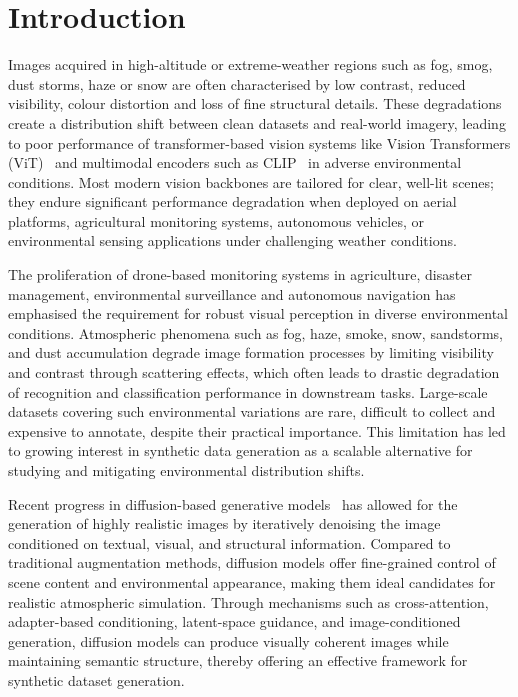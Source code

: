
\chapter{Introduction}
\label{chap:introduction}
\thispagestyle{empty}  %

Images acquired in high-altitude or extreme-weather regions such as fog, smog, dust storms, haze or snow are often characterised by low contrast, reduced visibility, colour distortion and loss of fine structural details. These degradations create a distribution shift between clean datasets and real-world imagery, leading to poor performance of transformer-based vision systems like Vision Transformers (ViT)~\cite{dosovitskiy2020vit} and multimodal encoders such as CLIP~\cite{radford2021clip} in adverse environmental conditions. Most modern vision backbones are tailored for clear, well-lit scenes; they endure significant performance degradation when deployed on aerial platforms, agricultural monitoring systems, autonomous vehicles, or environmental sensing applications under challenging weather conditions.

\noindent The proliferation of drone-based monitoring systems in agriculture, disaster management, environmental surveillance and autonomous navigation has emphasised the requirement for robust visual perception in diverse environmental conditions. Atmospheric phenomena such as fog, haze, smoke, snow, sandstorms, and dust accumulation degrade image formation processes by limiting visibility and contrast through scattering effects, which often leads to drastic degradation of recognition and classification performance in downstream tasks. Large-scale datasets covering such environmental variations are rare, difficult to collect and expensive to annotate, despite their practical importance. This limitation has led to growing interest in synthetic data generation as a scalable alternative for studying and mitigating environmental distribution shifts.

\noindent Recent progress in diffusion-based generative models~\cite{ho2020ddpm} has allowed for the generation of highly realistic images by iteratively denoising the image conditioned on textual, visual, and structural information. Compared to traditional augmentation methods, diffusion models offer fine-grained control of scene content and environmental appearance, making them ideal candidates for realistic atmospheric simulation. Through mechanisms such as cross-attention, adapter-based conditioning, latent-space guidance, and image-conditioned generation, diffusion models can produce visually coherent images while maintaining semantic structure, thereby offering an effective framework for synthetic dataset generation.

